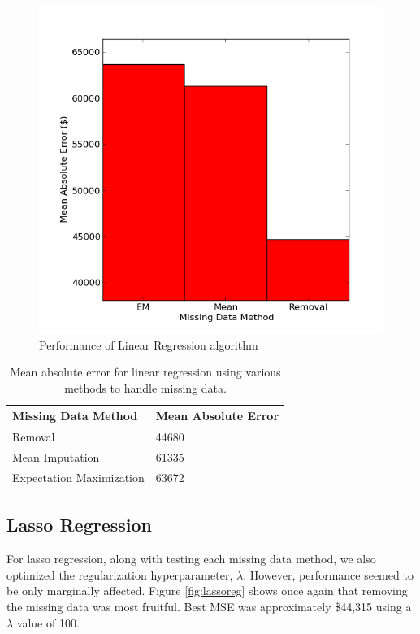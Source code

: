 \documentclass{acm_proc_article-sp}
\begin{document}
	 \begin{figure}[!htbp]
   		\centering
  		\includegraphics[width=\linewidth]{linear_regression_tuning.png}
    		\caption{Performance of Linear Regression algorithm}
    		\label{fig:linreg}
	\end{figure}
	\begin{center}
	
    \begin{table}	
    \begin{tabular}{| l | l |}
    \hline
    Missing Data Method & Mean Absolute Error \\ \hline
    \hline
    Removal & 44680 \\
    \hline
    Mean Imputation & 61335 \\
    \hline
    Expectation Maximization & 63672 \\
    \hline
    \end{tabular}
    \caption{Mean absolute error for linear regression using various methods to handle missing data.}
    \label{fig:linregres}
    \end{table}
\end{center}
\subsection{Lasso Regression}
	For lasso regression, along with testing each missing data method, we also optimized the regularization hyperparameter, $\lambda$. However, performance seemed to be only marginally affected. Figure \ref{fig:lassoreg} shows once again that removing the missing data was most fruitful. Best MSE was approximately \$44,315 using a$ \lambda$ value of 100.
	
\end{document}
